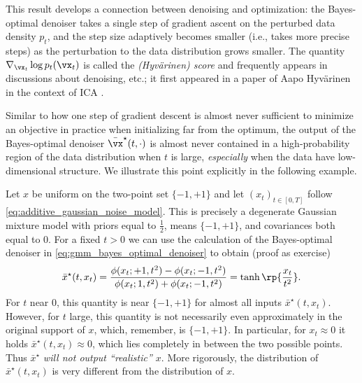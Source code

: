 \documentclass[../../book-main.tex]{subfiles}
\begin{document}
This result develops a connection between denoising and optimization:
the Bayes-optimal denoiser takes a single step of gradient ascent on
the perturbed data density \(p_{t}\), and the step size adaptively
becomes smaller (i.e., takes more precise steps) as the perturbation
to the data distribution grows smaller. The quantity
\(\nabla_{\vx_{t}}\log p_{t}(\vx_{t})\) is called the
\textit{(Hyv\"arinen) score} and frequently appears in discussions
about denoising, etc.; it first appeared in a paper of Aapo
Hyv\"arinen in the context of ICA \cite{hyvarinen05a}.

Similar to how one step of gradient descent is almost never sufficient to
minimize an objective in practice when initializing far from the optimum, the
output of the Bayes-optimal denoiser \(\bar{\vx}^{\star}(t, \cdot)\)
is almost never contained in a high-probability region of the data
distribution when \(t\) is large, \textit{especially} when the data
have low-dimensional structure. We illustrate this point explicitly
in the following example.
\begin{example}\label{example:denoising_twopoints}
    Let \(x\) be uniform on the two-point set \(\{-1, +1\}\) and let
    \((x_{t})_{t \in [0, T]}\) follow
    \eqref{eq:additive_gaussian_noise_model}. This is precisely a
    degenerate Gaussian mixture model with priors equal to
    \(\frac{1}{2}\), means \(\{-1, +1\}\), and covariances both equal
    to \(0\). For a fixed \(t > 0\) we can use the calculation of the
    Bayes-optimal denoiser in \eqref{eq:gmm_bayes_optimal_denoiser}
    to obtain (proof as exercise)
    \begin{equation}
        \bar{x}^{\star}(t, x_{t}) = \frac{\phi(x_{t} ; +1, t^{2}) - \phi(x_{t}
        ; -1, t^{2})}{\phi(x_{t} ; 1, t^{2}) + \phi(x_{t} ; -1,
        t^{2})} = \tanh\rp{\frac{x_{t}}{t^{2}}}.
    \end{equation}
    For \(t\) near \(0\), this quantity is near \(\{-1, +1\}\) for
    almost all inputs \(\bar{x}^{\star}(t, x_{t})\). However, for
    \(t\) large, this quantity is not necessarily even approximately
    in the original support of \(x\), which, remember, is \(\{-1,
    +1\}\). In particular, for \(x_{t} \approx 0\) it holds
    \(\bar{x}^{\star}(t, x_{t}) \approx 0\), which lies completely in
    between the two possible points. Thus \(\bar{x}^{\star}\)
    \textit{will not output ``realistic'' \(x\)}. More rigorously,
    the distribution of \(\bar{x}^{\star}(t, x_{t})\) is very
    different from the distribution of \(x\).
\end{example}
\end{document}
